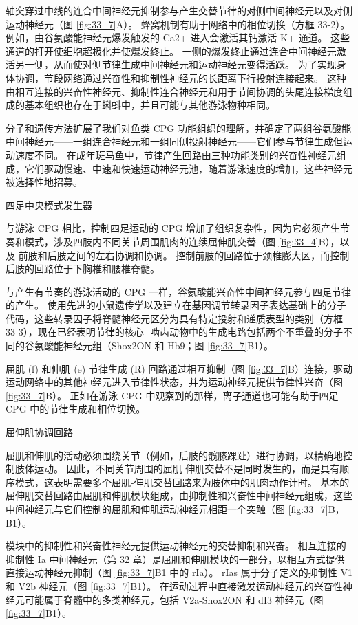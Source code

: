 轴突穿过中线的连合中间神经元抑制参与产生交替节律的对侧中间神经元以及对侧运动神经元（图 \ref{fig:33_7}A）。
蜂窝机制有助于网络中的相位切换（方框 33-2）。
例如，由谷氨酸能神经元爆发触发的 Ca2+ 进入会激活其钙激活 K+ 通道。
这些通道的打开使细胞超极化并使爆发终止。
一侧的爆发终止通过连合中间神经元激活另一侧，从而使对侧节律生成中间神经元和运动神经元变得活跃。
为了实现身体协调，节段网络通过兴奋性和抑制性神经元的长距离下行投射连接起来。
这种由相互连接的兴奋性神经元、抑制性连合神经元和用于节间协调的头尾连接梯度组成的基本组织也存在于蝌蚪中，并且可能与其他游泳物种相同。


分子和遗传方法扩展了我们对鱼类 CPG 功能组织的理解，并确定了两组谷氨酸能中间神经元——一组连合神经元和一组同侧投射神经元——它们参与节律生成但运动速度不同。
在成年斑马鱼中，节律产生回路由三种功能类别的兴奋性神经元组成，它们驱动慢速、中速和快速运动神经元池，随着游泳速度的增加，这些神经元被选择性地招募。


四足中央模式发生器

与游泳 CPG 相比，控制四足运动的 CPG 增加了组织复杂性，因为它必须产生节奏和模式，涉及四肢内不同关节周围肌肉的连续屈伸肌交替（图 \ref{fig:33_4}B），以及 前肢和后肢之间的左右协调和协调。
控制前肢的回路位于颈椎膨大区，而控制后肢的回路位于下胸椎和腰椎脊髓。


与产生有节奏的游泳活动的 CPG 一样，谷氨酸能兴奋性中间神经元参与四足节律的产生。
使用先进的小鼠遗传学以及建立在基因调节转录因子表达基础上的分子代码，这些转录因子将脊髓神经元区分为具有特定投射和递质表型的类别（方框 33-3），现在已经表明节律的核心- 啮齿动物中的生成电路包括两个不重叠的分子不同的谷氨酸能神经元组（Shox2ON 和 Hb9；图 \ref{fig:33_7}B1）。


屈肌 (f) 和伸肌 (e) 节律生成 (R) 回路通过相互抑制（图 \ref{fig:33_7}B）连接，驱动运动网络中的其他神经元进入节律性状态，并为运动神经元提供节律性兴奋（图 \ref{fig:33_7}B）。
正如在游泳 CPG 中观察到的那样，离子通道也可能有助于四足 CPG 中的节律生成和相位切换。


屈伸肌协调回路

屈肌和伸肌的活动必须围绕关节（例如，后肢的髋膝踝趾）进行协调，以精确地控制肢体运动。
因此，不同关节周围的屈肌-伸肌交替不是同时发生的，而是具有顺序模式，这表明需要多个屈肌-伸肌交替回路来为肢体中的肌肉动作计时。
基本的屈伸肌交替回路由屈肌和伸肌模块组成，由抑制性和兴奋性中间神经元组成，这些中间神经元与它们控制的屈肌和伸肌运动神经元相距一个突触（图 \ref{fig:33_7}B，B1）。


模块中的抑制性和兴奋性神经元提供运动神经元的交替抑制和兴奋。
相互连接的抑制性 Ia 中间神经元（第 32 章）是屈肌和伸肌模块的一部分，以相互方式提供直接运动神经元抑制（图 \ref{fig:33_7}B1 中的 rIa）。
rIas 属于分子定义的抑制性 V1 和 V2b 神经元（图 \ref{fig:33_7}B1）。
在运动过程中直接激发运动神经元的兴奋性神经元可能属于脊髓中的多类神经元，包括 V2a-Shox2ON 和 dI3 神经元（图 \ref{fig:33_7}B1）。



